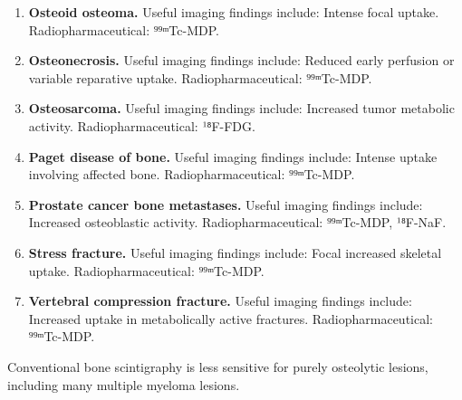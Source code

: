 \begin{enumerate}[leftmargin=*,itemsep=0.45em,topsep=0.4em]
\item \textbf{Osteoid osteoma.} Useful imaging findings include: Intense focal uptake. Radiopharmaceutical: ⁹⁹ᵐTc-MDP.
\item \textbf{Osteonecrosis.} Useful imaging findings include: Reduced early perfusion or variable reparative uptake. Radiopharmaceutical: ⁹⁹ᵐTc-MDP.
\item \textbf{Osteosarcoma.} Useful imaging findings include: Increased tumor metabolic activity. Radiopharmaceutical: ¹⁸F-FDG.
\item \textbf{Paget disease of bone.} Useful imaging findings include: Intense uptake involving affected bone. Radiopharmaceutical: ⁹⁹ᵐTc-MDP.
\item \textbf{Prostate cancer bone metastases.} Useful imaging findings include: Increased osteoblastic activity. Radiopharmaceutical: ⁹⁹ᵐTc-MDP, ¹⁸F-NaF.
\item \textbf{Stress fracture.} Useful imaging findings include: Focal increased skeletal uptake. Radiopharmaceutical: ⁹⁹ᵐTc-MDP.
\item \textbf{Vertebral compression fracture.} Useful imaging findings include: Increased uptake in metabolically active fractures. Radiopharmaceutical: ⁹⁹ᵐTc-MDP.
\end{enumerate}
Conventional bone scintigraphy is less sensitive for purely osteolytic lesions, including many multiple myeloma lesions.

